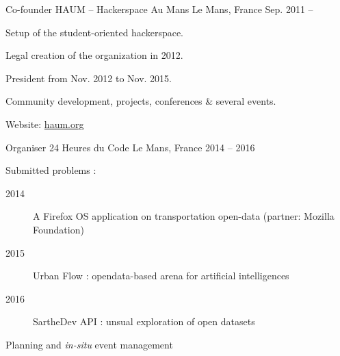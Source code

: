 

\begin{cventries}

  \cventry
    {Co-founder} %
    {HAUM -- Hackerspace Au Mans} %
    {Le Mans, France} %
    {Sep. 2011 --} %
    {
      \begin{cvitems} %
				\item {Setup of the student-oriented hackerspace.}
				\item {Legal creation of the organization in 2012.}
        \item {President from Nov. 2012 to Nov. 2015.}
				\item {Community development, projects, conferences \& several events.}
				\item {Website: \href{https://haum.org}{haum.org}}
      \end{cvitems}
    }

  \cventry
    {Organiser} %
    {24 Heures du Code} %
    {Le Mans, France} %
    {2014 -- 2016} %
    {
      \begin{cvitems} %
        \item {Submitted problems :
					\begin{description}
						\item[2014] A Firefox OS application on transportation open-data (partner: Mozilla Foundation)
						\item[2015] Urban Flow : opendata-based arena for artificial intelligences
						\item[2016] SartheDev API : unsual exploration of open datasets
					\end{description}
				}
				\item {Planning and \textit{in-situ} event management}
      \end{cvitems}
    }


\end{cventries}

